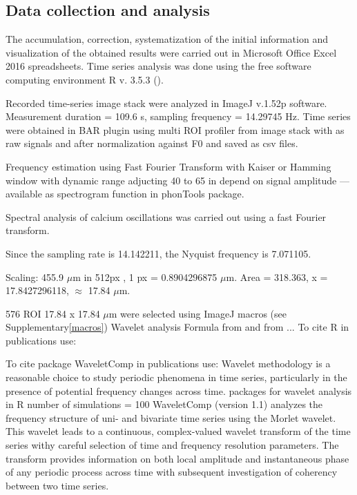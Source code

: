 \documentclass{biophys-new}
\begin{document}
\subsection*{Data collection and analysis}

The accumulation, correction, systematization of the initial information and visualization of the obtained results were carried out in Microsoft Office Excel 2016 spreadsheets.
Time series analysis was done using the free software computing environment R v. 3.5.3 (\cite{team2014r}).


Recorded time-series image stack were analyzed in ImageJ v.1.52p software\cite{rueden2017imagej2}.
Measurement duration = 109.6 s,  sampling frequency = 14.29745 Hz.
Time series were obtained in BAR plugin using multi ROI profiler from image stack with as raw signals and after normalization against F0 and saved as csv files.

Frequency estimation using Fast Fourier Transform with Kaiser or Hamming window with dynamic range adjucting 40 to 65 in depend on signal amplitude --- available as spectrogram function in phonTools package.

Spectral analysis of calcium oscillations was carried out using a fast Fourier transform.

Since the sampling rate is 14.142211, the Nyquist frequency is 7.071105.

Scaling: 455.9 $\mu$m in 512px , 1 px = 0.8904296875 $\mu$m.
Area = 318.363, x = 17.8427296118, $\approx$ 17.84 $\mu$m.


576 ROI 17.84 x 17.84 $\mu$m were selected using ImageJ macros (see Supplementary\ref{macros})
Wavelet analysis
Formula from \cite{grinsted2004application} and from \cite{kahraman2016multiple} ...
To cite R in publications use:  \cite{team2014r}

To cite package WaveletComp in publications use: \cite{rosch2016waveletcomp}
Wavelet methodology is a reasonable choice to study periodic phenomena in time series, particularly in the presence of potential frequency changes across time.
packages for wavelet analysis in R
number of simulations = 100
WaveletComp (version 1.1) analyzes the frequency structure of uni- and bivariate time series using the Morlet wavelet.
This wavelet leads to a continuous, complex-valued wavelet transform of the time series withy careful selection of time and frequency resolution parameters.
The transform provides information on both local amplitude and instantaneous phase of any periodic process across time with subsequent investigation of coherency between two time series.
\end{document}
